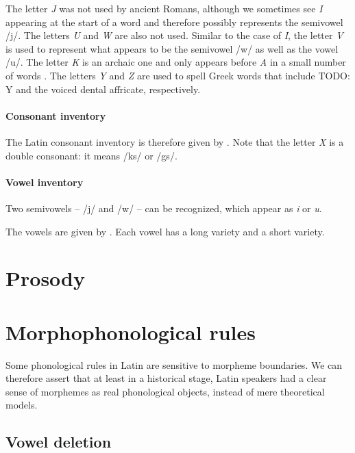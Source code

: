 \documentclass[a4paper, oneside, 12pt]{report}
\newcommand*{\citechap}[1]{chap.~{#1}}
\newcommand*{\citetable}[1]{Table~{#1}}
\newcommand{\form}[1]{\emph{#1}}
\begin{document}
The letter \form{J} was not used by ancient Romans, 
although we sometimes see \form{I} appearing at the start of a word 
and therefore possibly represents the semivowel /j/.
The letters \form{U} and \form{W} are also not used.
Similar to the case of \form{I},
the letter \form{V} is used to represent 
what appears to be the semivowel /w/ 
as well as the vowel /u/. 
The letter \form{K} is an archaic one 
and only appears before \form{A} in a small number of words
\citep[\citechap{2}]{oniga2014latin}.
The letters \form{Y} and \form{Z} are used to spell Greek words that 
include TODO: Y and the voiced dental affricate, respectively.

\paragraph*{Consonant inventory}
The Latin consonant inventory is therefore given by \citet[\citetable{3.1}]{oniga2014latin}.
Note that the letter \form{X} is a double consonant: 
it means /ks/ or /gs/.

\paragraph*{Vowel inventory}
Two semivowels -- /j/ and /w/ -- can be recognized,
which appear as \form{i} or \form{u}.

The vowels are given by \citet[\citetable{3.2}]{oniga2014latin}.
Each vowel has a long variety and a short variety.

\section{Prosody}



\section{Morphophonological rules}\label{sec:phonology.morphological}

Some phonological rules in Latin are sensitive to morpheme boundaries.
We can therefore assert that at least in a historical stage, 
Latin speakers had a clear sense of morphemes 
as real phonological objects,
instead of mere theoretical models.

\subsection{Vowel deletion}\label{sec:phonology.rule.deletion}
\end{document}
